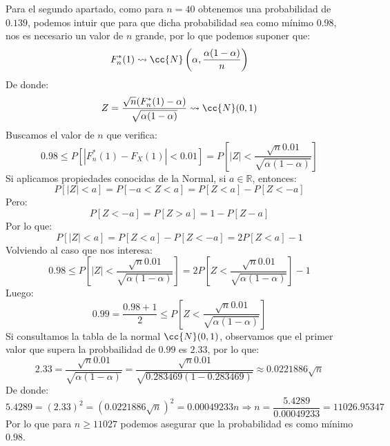 \begin{ejercicio}
    \noindent
    Para el segundo apartado, como para $n=40$ obtenemos una probabilidad de $0.139$, podemos intuir que para que dicha probabilidad sea como mínimo $0.98$, nos es necesario un valor de $n$ grande, por lo que podemos suponer que:
    \begin{equation*}
        F_n^\ast(1) \rightsquigarrow \cc{N}\left(\alpha, \dfrac{\alpha(1-\alpha)}{n}\right)
    \end{equation*}
    De donde:
    \begin{equation*}
        Z = \dfrac{\sqrt{n}(F_n^\ast(1)-\alpha)}{\sqrt{\alpha(1-\alpha)}} \rightsquigarrow \cc{N}(0,1)
    \end{equation*}
    Buscamos el valor de $n$ que verifica:
    \begin{equation*}
        0.98 \leq P[|F_n^\ast(1) - F_X(1)| < 0.01] = P\left[|Z| < \dfrac{\sqrt{n}0.01}{\sqrt{\alpha(1-\alpha)}}\right]
    \end{equation*}
    Si aplicamos propiedades conocidas de la Normal, si $a\in \mathbb{R}$, entonces:
    \begin{equation*}
        P[|Z| < a] = P[-a < Z < a] = P[Z<a] - P[Z< -a]
    \end{equation*}
    Pero:
    \begin{equation*}
        P[Z< -a] = P[Z>a] = 1-P[Z-a]
    \end{equation*}
    Por lo que:
    \begin{equation*}
        P[|Z| < a] = P[Z<a] - P[Z < -a] = 2P[Z<a] - 1
    \end{equation*}
    Volviendo al caso que nos interesa:
    \begin{equation*}
        0.98 \leq P\left[|Z| < \dfrac{\sqrt{n}0.01}{\sqrt{\alpha(1-\alpha)}}\right] = 2P\left[Z<\dfrac{\sqrt{n}0.01}{\sqrt{\alpha(1-\alpha)}}\right] - 1
    \end{equation*}
    Luego:
    \begin{equation*}
        0.99 = \dfrac{0.98+1}{2} \leq P\left[Z < \dfrac{\sqrt{n}0.01}{\sqrt{\alpha(1-\alpha)}}\right]
    \end{equation*}
    Si consultamos la tabla de la normal $\cc{N}(0,1)$, observamos que el primer valor que supera la probbailidad de $0.99$ es $2.33$, por lo que:
    \begin{equation*}
        2.33 = \dfrac{\sqrt{n}0.01}{\sqrt{\alpha(1-\alpha)}} = \dfrac{\sqrt{n}0.01}{\sqrt{0.283469(1-0.283469)}} \approx 0.0221886 \sqrt{n}
    \end{equation*}
    De donde:
    \begin{equation*}
        5.4289 = {(2.33)}^{2} = {(0.0221886\sqrt{n})}^{2} = 0.00049233 n \Longrightarrow n = \dfrac{5.4289}{0.00049233} = 11026.95347
    \end{equation*}
    Por lo que para $n \geq 11027$ podemos asegurar que la probabilidad es como mínimo $0.98$.
\end{ejercicio}

